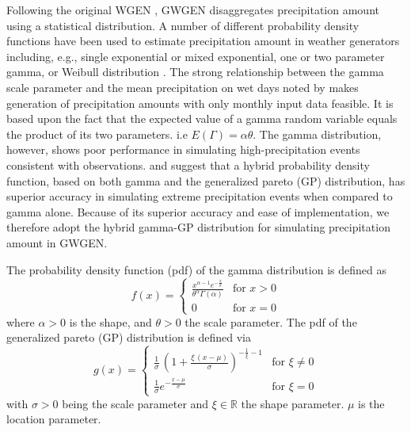 \documentclass[
11pt, %
english, %
singlespacing, %
headsepline, %
]{MastersDoctoralThesis} %
\begin{document}
\begin{NoHyper}
\begin{refsection}
Following the original WGEN \citep{Richardson1981}, GWGEN disaggregates precipitation amount using a statistical distribution. A number of different probability density functions have been used to estimate precipitation amount in weather generators including, e.g., single exponential or mixed exponential, one or two parameter gamma, or Weibull distribution \citep{WilksWilby1999}. The strong relationship between the gamma scale parameter and the mean precipitation on wet days noted by \cite{GengDevriesSupit1986} makes generation of precipitation amounts with only monthly input data feasible. It is based upon the fact that the expected value of a gamma random variable equals the product of its two parameters. i.e $E(\Gamma) = \alpha\theta$. The gamma distribution, however, shows poor performance in simulating high-precipitation events consistent with observations. \cite{FurrerKatz2008} and \cite{NeykovNeytchevZucchini2014} suggest that a hybrid probability density function, based on both gamma and the generalized pareto (GP) distribution, has superior accuracy in simulating extreme precipitation events when compared to gamma alone. Because of its superior accuracy and ease of implementation, we therefore adopt the hybrid gamma-GP distribution for simulating precipitation amount in GWGEN.

The probability density function (pdf) of the gamma distribution is defined as
\begin{equation}
f(x) = \begin{cases}
\frac{x^{\alpha - 1}e^{-\frac{x}{\theta}}}{\theta^{\alpha} \Gamma(\alpha)} & \text{for } x > 0 \\
0 & \text{for } x = 0
\end{cases} \label{eq:gamma}
\end{equation}
where $\alpha > 0$ is the shape, and $\theta > 0$ the scale parameter.
The pdf of the generalized pareto (GP) distribution is defined via
\begin{equation}
g(x) = \begin{cases}
\frac{1}{\sigma}\, \left( 1 + \frac{\xi\,\left(x - \mu\right)}{\sigma}\right)^{-\frac{1}{\xi} - 1} \label{eq:GP} & \text{for } \xi \neq 0 \\
\frac{1}{\sigma}e^{-\frac{x-\mu}{\sigma}} & \text{for } \xi = 0
\end{cases}
\end{equation}
with $\sigma > 0$ being the scale parameter and $\xi \in \mathbb{R}$ the shape parameter. $\mu$ is the location parameter.


\end{refsection}
\end{NoHyper}
\end{document}
